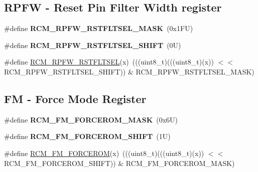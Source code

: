 \subsection*{R\+P\+FW -\/ Reset Pin Filter Width register}
\begin{DoxyCompactItemize}
\item 
\mbox{\label{group___r_c_m___register___masks_ga60f29f78d245476ae9716d81b5728739}} 
\#define {\bfseries R\+C\+M\+\_\+\+R\+P\+F\+W\+\_\+\+R\+S\+T\+F\+L\+T\+S\+E\+L\+\_\+\+M\+A\+SK}~(0x1\+F\+U)
\item 
\mbox{\label{group___r_c_m___register___masks_ga489d9757284af48af000b769d36bf21a}} 
\#define {\bfseries R\+C\+M\+\_\+\+R\+P\+F\+W\+\_\+\+R\+S\+T\+F\+L\+T\+S\+E\+L\+\_\+\+S\+H\+I\+FT}~(0\+U)
\item 
\#define \mbox{\hyperlink{group___r_c_m___register___masks_ga2b2127fc8187199672452ef9f62f6a89}{R\+C\+M\+\_\+\+R\+P\+F\+W\+\_\+\+R\+S\+T\+F\+L\+T\+S\+EL}}(x)~(((uint8\+\_\+t)(((uint8\+\_\+t)(x)) $<$$<$ R\+C\+M\+\_\+\+R\+P\+F\+W\+\_\+\+R\+S\+T\+F\+L\+T\+S\+E\+L\+\_\+\+S\+H\+I\+FT)) \& R\+C\+M\+\_\+\+R\+P\+F\+W\+\_\+\+R\+S\+T\+F\+L\+T\+S\+E\+L\+\_\+\+M\+A\+SK)
\end{DoxyCompactItemize}
\subsection*{FM -\/ Force Mode Register}
\begin{DoxyCompactItemize}
\item 
\mbox{\label{group___r_c_m___register___masks_gaa714bdc3f6be876962f27cf3343997df}} 
\#define {\bfseries R\+C\+M\+\_\+\+F\+M\+\_\+\+F\+O\+R\+C\+E\+R\+O\+M\+\_\+\+M\+A\+SK}~(0x6\+U)
\item 
\mbox{\label{group___r_c_m___register___masks_gab2104dc642355f01f10e79ba09960f67}} 
\#define {\bfseries R\+C\+M\+\_\+\+F\+M\+\_\+\+F\+O\+R\+C\+E\+R\+O\+M\+\_\+\+S\+H\+I\+FT}~(1\+U)
\item 
\#define \mbox{\hyperlink{group___r_c_m___register___masks_ga554e1d57f6e01431b0f67225200a5c6b}{R\+C\+M\+\_\+\+F\+M\+\_\+\+F\+O\+R\+C\+E\+R\+OM}}(x)~(((uint8\+\_\+t)(((uint8\+\_\+t)(x)) $<$$<$ R\+C\+M\+\_\+\+F\+M\+\_\+\+F\+O\+R\+C\+E\+R\+O\+M\+\_\+\+S\+H\+I\+FT)) \& R\+C\+M\+\_\+\+F\+M\+\_\+\+F\+O\+R\+C\+E\+R\+O\+M\+\_\+\+M\+A\+SK)
\end{DoxyCompactItemize}
